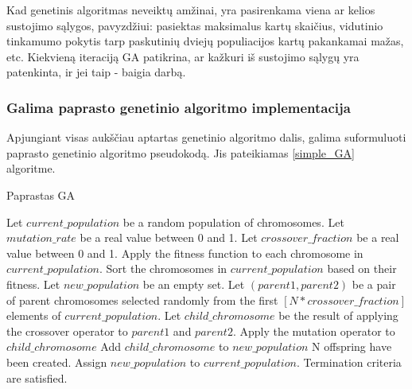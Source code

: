 \documentclass{VUMIFInfKursinis}
\begin{document}
Kad genetinis algoritmas neveiktų amžinai, yra pasirenkama viena ar kelios sustojimo sąlygos, pavyzdžiui: pasiektas maksimalus
kartų skaičius, vidutinio tinkamumo pokytis tarp paskutinių dviejų populiacijos kartų pakankamai mažas, etc.
Kiekvieną iteraciją GA patikrina, ar kažkuri iš sustojimo sąlygų yra patenkinta, ir jei taip - baigia darbą.

\subsubsection{Galima paprasto genetinio algoritmo implementacija}

Apjungiant visas aukščiau aptartas genetinio algoritmo dalis, galima suformuluoti paprasto genetinio algoritmo pseudokodą.
Jis pateikiamas \ref{simple_GA} algoritme.

\begin{algorithm}[H]
  \caption{Paprastas GA}\label{simple_GA}
  \begin{algorithmic}
    \State Let $current\_population$ be a random population of chromosomes.
    \State Let $mutation\_rate$ be a real value between 0 and 1.
    \State Let $crossover\_fraction$ be a real value between 0 and 1.
    \Repeat
      \State Apply the fitness function to each chromosome in $current\_population$.
      \State Sort the chromosomes in $current\_population$ based on their fitness. %
      \State Let $new\_population$ be an empty set.
      \Repeat
        \State Let $(parent1, parent2)$ be a pair of parent chromosomes selected randomly from the first $[N * crossover\_fraction]$ elements of $current\_population$.
        \State Let $child\_chromosome$ be the result of applying the crossover operator to $parent1$ and $parent2$.
          \State Apply the mutation operator to $child\_chromosome$
        \EndIf
        \State Add $child\_chromosome$ to $new\_population$
      \Until N offspring have been created.
      \State Assign $new\_population$ to $current\_population$.
    \Until Termination criteria are satisfied.
  \end{algorithmic}
\end{algorithm}
\end{document}
